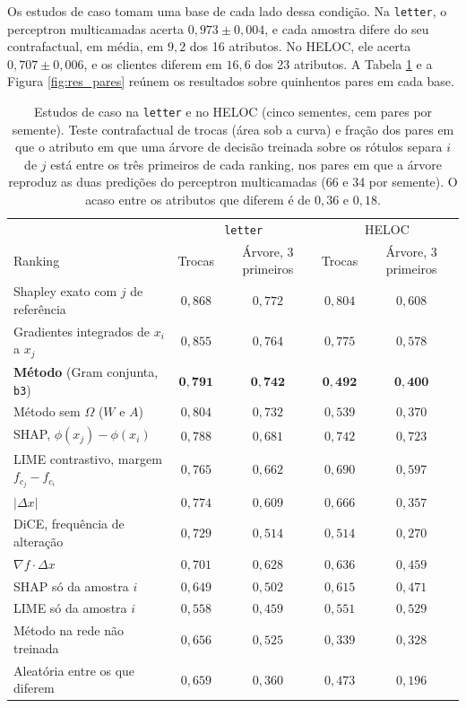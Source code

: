 Os estudos de caso tomam uma base de cada lado dessa condição. Na \texttt{letter}, o perceptron multicamadas acerta $0{,}973 \pm 0{,}004$, e cada amostra difere do seu contrafactual, em média, em $9{,}2$ dos 16 atributos. No HELOC, ele acerta $0{,}707 \pm 0{,}006$, e os clientes diferem em $16{,}6$ dos 23 atributos. A Tabela \ref{tab:res_letter} e a Figura \ref{fig:res_pares} reúnem os resultados sobre quinhentos pares em cada base.

\begin{table}[pos=htbp]
\centering
\caption{Estudos de caso na \texttt{letter} e no HELOC (cinco sementes, cem pares por semente). Teste contrafactual de trocas (área sob a curva) e fração dos pares em que o atributo em que uma árvore de decisão treinada sobre os rótulos separa $i$ de $j$ está entre os três primeiros de cada ranking, nos pares em que a árvore reproduz as duas predições do perceptron multicamadas (66 e 34 por semente). O acaso entre os atributos que diferem é de $0{,}36$ e $0{,}18$.}
\label{tab:res_letter}
\footnotesize
\setlength{\tabcolsep}{4pt}
\begin{tabular}{l c c c c}
\hline
 & \multicolumn{2}{c}{\texttt{letter}} & \multicolumn{2}{c}{HELOC} \\
Ranking & Trocas & Árvore, 3 primeiros & Trocas & Árvore, 3 primeiros \\
\hline
Shapley exato com $j$ de referência & $0{,}868$ & $0{,}772$ & $0{,}804$ & $0{,}608$ \\
Gradientes integrados de $x_i$ a $x_j$ & $0{,}855$ & $0{,}764$ & $0{,}775$ & $0{,}578$ \\
\textbf{Método} (Gram conjunta, \texttt{b3}) & $\mathbf{0{,}791}$ & $\mathbf{0{,}742}$ & $\mathbf{0{,}492}$ & $\mathbf{0{,}400}$ \\
Método sem $\Omega$ ($W$ e $A$) & $0{,}804$ & $0{,}732$ & $0{,}539$ & $0{,}370$ \\
SHAP, $\phi(x_j) - \phi(x_i)$ & $0{,}788$ & $0{,}681$ & $0{,}742$ & $0{,}723$ \\
LIME contrastivo, margem $f_{c_j} - f_{c_i}$ & $0{,}765$ & $0{,}662$ & $0{,}690$ & $0{,}597$ \\
$|\Delta x|$ & $0{,}774$ & $0{,}609$ & $0{,}666$ & $0{,}357$ \\
DiCE, frequência de alteração & $0{,}729$ & $0{,}514$ & $0{,}514$ & $0{,}270$ \\
$\nabla f \cdot \Delta x$ & $0{,}701$ & $0{,}628$ & $0{,}636$ & $0{,}459$ \\
SHAP só da amostra $i$ & $0{,}649$ & $0{,}502$ & $0{,}615$ & $0{,}471$ \\
LIME só da amostra $i$ & $0{,}558$ & $0{,}459$ & $0{,}551$ & $0{,}529$ \\
Método na rede não treinada & $0{,}656$ & $0{,}525$ & $0{,}339$ & $0{,}328$ \\
Aleatória entre os que diferem & $0{,}659$ & $0{,}360$ & $0{,}473$ & $0{,}196$ \\
\hline
\end{tabular}
\end{table}

